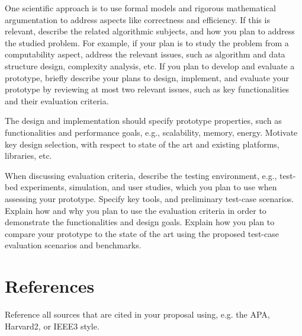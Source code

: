 \documentclass{article}
\begin{document}
One scientific approach is to use formal models and rigorous
mathematical argumentation to address aspects like correctness and efficiency. If this is relevant, describe the related algorithmic
subjects, and how you plan to address the studied problem. For example, if your plan is to study the problem from a computability aspect,
address the relevant issues, such as algorithm and data structure design, complexity analysis, etc.  If you plan to develop and
evaluate a prototype, briefly describe your plans to design, implement, and evaluate your prototype by reviewing at most two relevant
issues, such as key functionalities and their evaluation criteria.

The design and implementation should specify prototype properties,
such as functionalities and performance goals, e.g., scalability, memory, energy. Motivate key design selection, with respect to state
of the art and existing platforms, libraries, etc.

When discussing evaluation criteria, describe the testing environment, e.g., test-bed
experiments, simulation, and user studies, which you plan to use when assessing your prototype. Specify key tools, and preliminary
test-case scenarios. Explain how and why you plan to use the evaluation criteria in order to demonstrate the functionalities and
design goals. Explain how you plan to compare your prototype to the state of the art using the proposed test-case evaluation scenarios
and benchmarks.



\section{References}



%

%



Reference all sources that are cited in your proposal using, e.g. the APA, Harvard2, or IEEE3 style.
\end{document}
